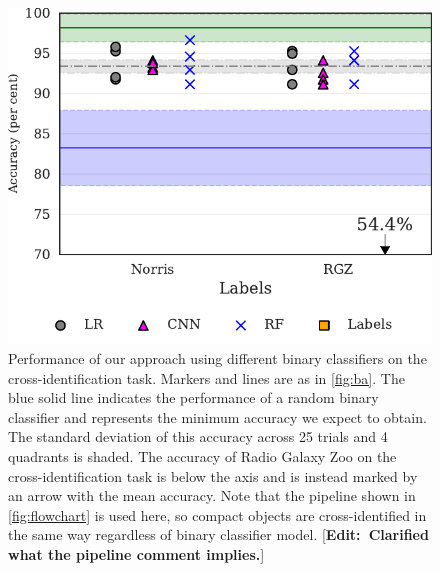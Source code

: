 \documentclass[fleqn,usenatbib,usedcolumn]{mnras}
\newcommand{\edit}[1]{ {\color{red}[{\bf Edit:~{#1}}]} }
\begin{document}
    \begin{figure}
      \centering
      \includegraphics[width=0.9\columnwidth]{images/cdfs_cross_identification_grid.pdf}
      \caption{Performance of our approach using different binary classifiers on the cross-identification task. Markers and lines are as in \autoref{fig:ba}. The blue solid line indicates the performance of a random binary classifier and represents the minimum accuracy we expect to obtain. The standard deviation of this accuracy across 25 trials and 4 quadrants is shaded. The accuracy of Radio Galaxy Zoo on the cross-identification task is below the axis and is instead marked by an arrow with the mean accuracy. Note that the pipeline shown in \autoref{fig:flowchart} is used here, so compact objects are cross-identified in the same way regardless of binary classifier model. \edit{Clarified what the pipeline comment implies.} \label{fig:cross-id-accuracy}}
    \end{figure}
\end{document}
